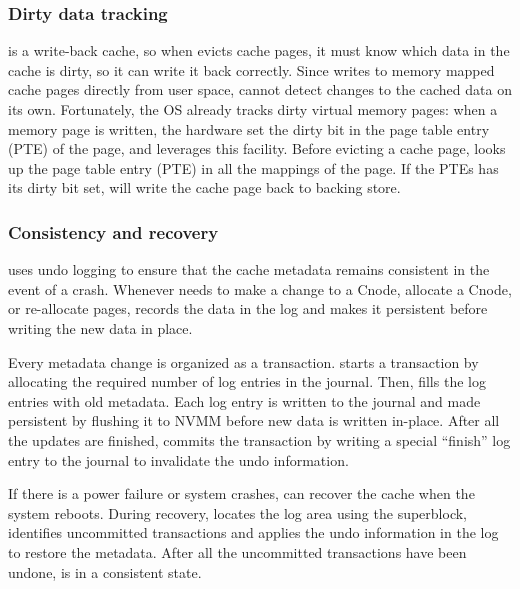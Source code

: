 \subsubsection{Dirty data tracking}
\label{sec:dirty}

\CChell{} is a write-back cache, so when \drv{} evicts cache pages, it must know
which data in the cache is dirty, so it can write it back correctly.
Since \lib{} writes to memory mapped cache pages
directly from user space, \drv{} cannot detect changes to the cached data on its own.
Fortunately, the OS already tracks dirty virtual memory
pages: when a memory page is written, the hardware set the dirty bit in the 
page table entry (PTE) of the page, and \CChell{} leverages this facility.
Before evicting a cache page,
\drv{} looks up the page table entry (PTE) in all the mappings of the page.  If
the PTEs has its dirty bit set, \drv{} will write the cache page back to backing store.


\subsubsection{Consistency and recovery}
\label{sec:consistency}


\CChell{} uses undo logging to ensure that the cache metadata remains
consistent in the event of a crash.  Whenever \drv{} needs to make
a change to a Cnode, allocate a Cnode, or re-allocate pages,
\drv{} records the data in the log and makes it persistent before writing
the new data in place.

Every metadata change is organized as a transaction.  \Drv{} starts
a transaction by allocating the required number of log entries in the journal.
Then, \drv{} fills the log entries with old metadata.
Each log entry is written to the journal and made persistent by flushing it
to NVMM before new data is written in-place.
After all the updates are finished, \drv{} commits the transaction
by writing a special ``finish'' log entry to the journal to invalidate the undo information.




If there is a power failure or system crashes, \drv{} can recover the cache
when the system reboots.  During recovery, \drv{} locates the log area using the superblock,
identifies uncommitted transactions and applies the undo information in the log to restore the metadata.
After all the uncommitted transactions have been undone, \CChell{} is in a consistent state.
